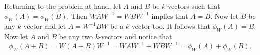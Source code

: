 \documentclass[12pt]{article}
\begin{document}
Returning to the problem at hand, let $A$ and $B$ be $k$-vectors such that $\phi_W(A)=\phi_W(B)$.
Then $WAW^{-1}=WBW^{-1}$ implies that $A=B$.  Now let $B$
be any $k$-vector and let $A=W^{-1}BW$ be a $k$-vector too.  It follows that $\phi_W(A)=B$.
Now let $A$ and $B$ be any two $k$-vectors and notice that
\begin{equation*}
\phi_W(A+B) = W(A+B)W^{-1} = WAW^{-1}+WBW^{-1} = \phi_W(A)+\phi_W(B).
\end{equation*}
\end{document}
